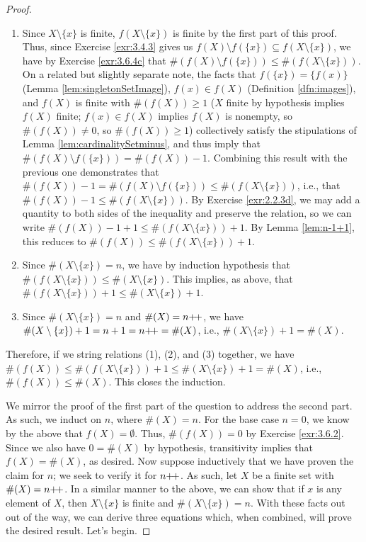 \documentclass[../main.tex]{subfiles}
\begin{document}
\begin{enumerate}[ref={\thesection.\arabic*}]
\begin{prp}
\begin{enumerate}[label={\textup{(}\alph*\textup{)}},ref={\theenumi\alph*}]
\begin{proof}
                \begin{enumerate}[label={(\arabic*)}]
                    \item Since $X\setminus\{x\}$ is finite, $f(X\setminus\{x\})$ is finite by the first part of this proof. Thus, since Exercise \ref{exr:3.4.3} gives us $f(X)\setminus f(\{x\})\subseteq f(X\setminus\{x\})$, we have by Exercise \ref{exr:3.6.4c} that $\#(f(X)\setminus f(\{x\}))\leq\#(f(X\setminus\{x\}))$. On a related but slightly separate note, the facts that $f(\{x\})=\{f(x)\}$ (Lemma \ref{lem:singletonSetImage}), $f(x)\in f(X)$ (Definition \ref{dfn:images}), and $f(X)$ is finite with $\#(f(X))\geq 1$ ($X$ finite by hypothesis implies $f(X)$ finite; $f(x)\in f(X)$ implies $f(X)$ is nonempty, so $\#(f(X))\neq 0$, so $\#(f(X))\geq 1$) collectively satisfy the stipulations of Lemma \ref{lem:cardinalitySetminus}, and thus imply that $\#(f(X)\setminus f(\{x\}))=\#(f(X))-1$. Combining this result with the previous one demonstrates that $\#(f(X))-1=\#(f(X)\setminus f(\{x\}))\leq\#(f(X\setminus\{x\}))$, i.e., that $\#(f(X))-1\leq\#(f(X\setminus\{x\}))$. By Exercise \ref{exr:2.2.3d}, we may add a quantity to both sides of the inequality and preserve the relation, so we can write $\#(f(X))-1+1\leq\#(f(X\setminus\{x\}))+1$. By Lemma \ref{lem:n-1+1}, this reduces to $\#(f(X))\leq\#(f(X\setminus\{x\}))+1$.
                    \item Since $\#(X\setminus\{x\})=n$, we have by induction hypothesis that $\#(f(X\setminus\{x\}))\leq\#(X\setminus\{x\})$. This implies, as above, that $\#(f(X\setminus\{x\}))+1\leq\#(X\setminus\{x\})+1$.
                    \item Since $\#(X\setminus\{x\})=n$ and $\#(X)=n{+\!+}$, we have $\#(X\setminus\{x\})+1=n+1=n{+\!+}=\#(X)$, i.e., $\#(X\setminus\{x\})+1=\#(X)$.
                \end{enumerate}
                Therefore, if we string relations (1), (2), and (3) together, we have $\#(f(X))\leq\#(f(X\setminus\{x\}))+1\leq\#(X\setminus\{x\})+1=\#(X)$, i.e., $\#(f(X))\leq\#(X)$. This closes the induction.\par
                \medskip
                We mirror the proof of the first part of the question to address the second part. As such, we induct on $n$, where $\#(X)=n$. For the base case $n=0$, we know by the above that $f(X)=\emptyset$. Thus, $\#(f(X))=0$ by Exercise \ref{exr:3.6.2}. Since we also have $0=\#(X)$ by hypothesis, transitivity implies that $f(X)=\#(X)$, as desired. Now suppose inductively that we have proven the claim for $n$; we seek to verify it for $n{+\!+}$. As such, let $X$ be a finite set with $\#(X)=n{+\!+}$. In a similar manner to the above, we can show that if $x$ is any element of $X$, then $X\setminus\{x\}$ is finite and $\#(X\setminus\{x\})=n$. With these facts out out of the way, we can derive three equations which, when combined, will prove the desired result. Let's begin.

\end{proof}
\end{enumerate}
\end{prp}
\end{enumerate}
\end{document}
